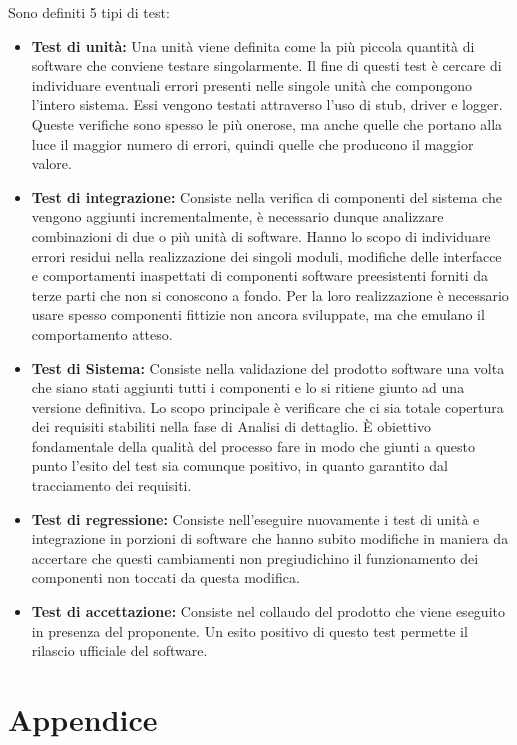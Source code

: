 \documentclass[a4paper]{article}
\begin{document}
				Sono definiti 5 tipi di test:
				\begin{itemize}
					\item \textbf{Test di unità:} Una unità viene definita come la più piccola quantità di software che conviene
					testare singolarmente. Il fine di questi test è cercare di individuare eventuali errori presenti nelle singole
					unità che compongono l'intero sistema. Essi vengono testati attraverso l'uso di stub, driver e logger. Queste
					verifiche sono spesso le più onerose, ma anche quelle che portano alla luce il maggior numero di errori, quindi
					quelle che producono il maggior valore.
					\item \textbf{Test di integrazione:} Consiste nella verifica di componenti del sistema che vengono aggiunti
					incrementalmente, è necessario dunque analizzare combinazioni di due o più unità di software. Hanno lo scopo di
					individuare errori residui nella realizzazione dei singoli moduli, modifiche delle interfacce e comportamenti
					inaspettati di componenti software preesistenti forniti da terze parti che non si conoscono a fondo. Per la
					loro realizzazione è necessario usare spesso componenti fittizie non ancora sviluppate, ma che emulano il
					comportamento atteso.
					\item \textbf{Test di Sistema:} Consiste nella validazione del prodotto software una volta che siano stati
					aggiunti tutti i componenti e lo si ritiene giunto ad una versione definitiva. Lo scopo principale è verificare
					che ci sia totale copertura dei requisiti stabiliti nella fase di Analisi di dettaglio. È obiettivo
					fondamentale della qualità del processo fare in modo che giunti a questo punto l'esito del test sia comunque
					positivo, in quanto garantito dal tracciamento dei requisiti.
					\item \textbf{Test di regressione:} Consiste nell'eseguire nuovamente i test di unità e integrazione in
					porzioni di software che hanno subito modifiche in maniera da accertare che questi cambiamenti non
					pregiudichino il funzionamento dei componenti non toccati da questa modifica.
					\item \textbf{Test di accettazione:} Consiste nel collaudo del prodotto che viene eseguito in presenza del
					proponente. Un esito positivo di questo test permette il rilascio ufficiale del software.
					
				\end{itemize}
				
		\section{Appendice}
\end{document}

